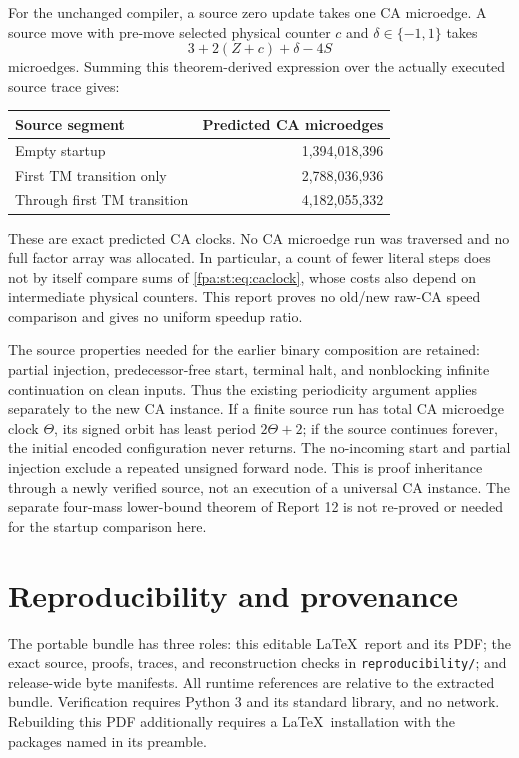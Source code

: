 \documentclass[11pt,a4paper]{article}
\numberwithin{equation}{section}
\newcommand{\code}[1]{\texttt{\small #1}}
\begin{document}
For the unchanged compiler, a source zero update takes one CA microedge. A
source move with pre-move selected physical counter $c$ and
$\delta\in\{-1,1\}$ takes
\begin{equation}
 3+2(Z+c)+\delta-4S
 \label{fpa:st:eq:caclock}
\end{equation}
microedges. Summing this theorem-derived expression over the actually
executed source trace gives:
\begin{center}
\begin{tabular}{@{}lr@{}}
\toprule
Source segment & Predicted CA microedges\\
\midrule
Empty startup & 1,394,018,396\\
First TM transition only & 2,788,036,936\\
Through first TM transition & 4,182,055,332\\
\bottomrule
\end{tabular}
\end{center}
These are exact predicted CA clocks. No CA microedge run was traversed and
no full factor array was allocated. In particular, a count of fewer literal
steps does not by itself compare sums of \eqref{fpa:st:eq:caclock}, whose costs
also depend on intermediate physical counters. This report proves no old/new
raw-CA speed comparison and gives no uniform speedup ratio.

The source properties needed for the earlier binary composition are retained:
partial injection, predecessor-free start, terminal halt, and nonblocking
infinite continuation on clean inputs. Thus the existing periodicity argument
applies separately to the new CA instance. If a finite source run has total
CA microedge clock $\Theta$, its signed orbit has least period $2\Theta+2$;
if the source continues forever, the initial encoded configuration never
returns. The no-incoming start and partial injection exclude a repeated
unsigned forward node. This is proof inheritance through a newly verified
source, not an execution of a universal CA instance. The separate four-mass
lower-bound theorem of Report 12 is not re-proved or needed for the startup
comparison here.

\section{Reproducibility and provenance}
\label{fpa:st:sec:replay}
The portable bundle has three roles: this editable \LaTeX\ report and its
PDF; the exact source, proofs, traces, and reconstruction checks in
\code{reproducibility/}; and release-wide byte manifests. All runtime
references are relative to the extracted bundle. Verification requires
Python 3 and its standard library, and no network. Rebuilding this PDF
additionally requires a \LaTeX\ installation with the packages named in
its preamble.
\end{document}
